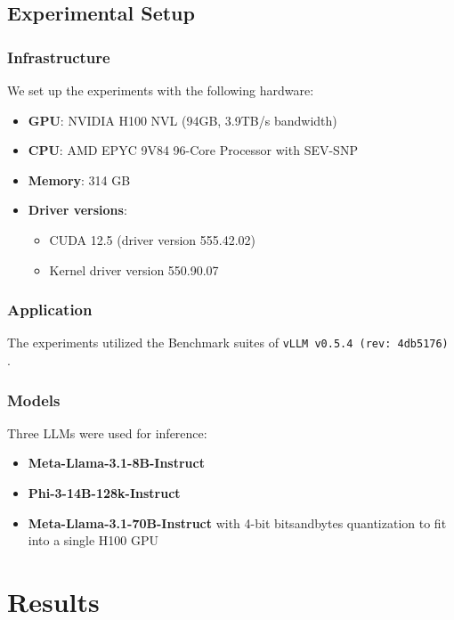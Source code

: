 \documentclass{article}
\begin{document}
\subsection{Experimental Setup}

\subsubsection{Infrastructure}

We set up the experiments with the following hardware:

\begin{itemize}
    \item \textbf{GPU}: NVIDIA H100 NVL (94GB, 3.9TB/s bandwidth)
    \item \textbf{CPU}: AMD EPYC 9V84 96-Core Processor with SEV-SNP
    \item \textbf{Memory}: 314 GB
    \item \textbf{Driver versions}:
    \begin{itemize}
        \item CUDA 12.5 (driver version 555.42.02)
        \item Kernel driver version 550.90.07
    \end{itemize}
\end{itemize}

\subsubsection{Application}

The experiments utilized the Benchmark suites of \texttt{vLLM v0.5.4 (rev: 4db5176)} \cite{kwon2023efficient}.

\subsubsection{Models}

Three LLMs were used for inference:

\begin{itemize}
    \item \textbf{Meta-Llama-3.1-8B-Instruct}
    \item \textbf{Phi-3-14B-128k-Instruct}
    \item \textbf{Meta-Llama-3.1-70B-Instruct} with 4-bit bitsandbytes quantization to fit into a single H100 GPU
\end{itemize}

\section{Results}
\end{document}
